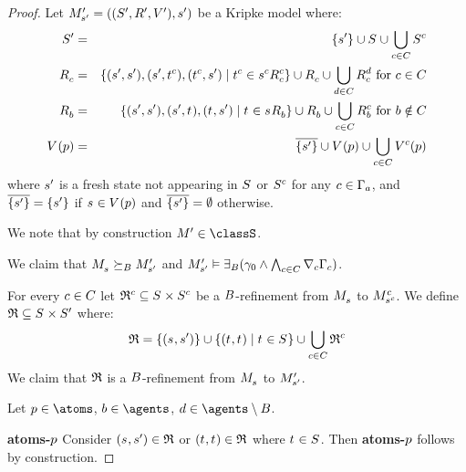 \begin{proof}
Let $\kPModelAndTupleP{\kStateSP}$ be a Kripke model where:
\begin{eqnarray*}
    \kStatesP &=& \{\kStateSP\} \cup \kStates \cup \bigcup_{\agentC \in \agentsC} \kStates[\agentC]\\
    \kAccessibilityC &=& \{(\kStateSP, \kStateSP), (\kStateSP, \kStateT[\agentC]), (\kStateT[\agentC], \kStateSP) \mid \kStateT[\agentC] \in \kSuccessorsC[\agentC]{\kStateS[\agentC]}\} \cup \kAccessibilityC \cup \bigcup_{\agentD \in \agentsC} \kAccessibilityC[\agentD] \text{ for } \agentC \in \agentsC\\
    \kAccessibilityB &=& \{(\kStateSP, \kStateSP), (\kStateSP, \kStateT), (\kStateT, \kStateSP) \mid \kStateT \in \kSuccessorsB{\kStateS}\} \cup \kAccessibilityB \cup \bigcup_{\agentC \in \agentsC} \kAccessibilityB[\agentC] \text{ for } \agentB \notin \agentsC\\
    \kValuation(\atomP) &=& \overline{\{\kStateSP\}} \cup \kValuation(\atomP) \cup \bigcup_{\agentC \in \agentsC} \kValuation[\agentC](\atomP)
\end{eqnarray*}
where $\kStateSP$ is a fresh state not appearing in $\kStates$ or $\kStates[\agentC]$ for any $\agentC \in \Gamma_\agentA$, and $\overline{\{\kStateSP\}} = \{\kStateSP\}$ if $\kStateS \in \kValuation(\atomP)$ and $\overline{\{\kStateSP\}} = \emptyset$ otherwise.

We note that by construction $\kModelP \in \classS$.

We claim that $\kPModel{\kStateS} \simulatesBs \kPModelP{\kStateSP}$ and $\kPModelP{\kStateSP} \entails \somerefsBs (\gamma_0 \land \bigwedge_{\agentC \in \agentsC} \coversC \Gamma_\agentC)$.

For every $\agentC \in \agentsC$ let $\refinement^\agentC \subseteq \kStates \times \kStates[\agentC]$ be a $\agentsB$-refinement from $\kPModel{\kStateS}$ to $\kPModel[\agentC]{\kStateS[\agentC]}$.
We define $\refinement \subseteq \kStates \times \kStatesP$ where:
$$
\refinement = \{(\kStateS, \kStateSP)\} \cup \{(\kStateT, \kStateT) \mid \kStateT \in \kStates\} \cup \bigcup_{\agentC \in \agentsC} \refinement^\agentC
$$
We claim that $\refinement$ is a $\agentsB$-refinement from $\kPModel{\kStateS}$ to $\kPModelP{\kStateSP}$.

Let $\atomP \in \atoms$, $\agentB \in \agents$, $\agentD \in \agents \setminus \agentsB$.

{\bf atoms-$\atomP$}
Consider $(\kStateS, \kStateSP) \in \refinement$ or $(\kStateT, \kStateT) \in \refinement$ where $\kStateT \in \kStates$.
Then {\bf atoms-$\atomP$} follows by construction.


\end{proof}
